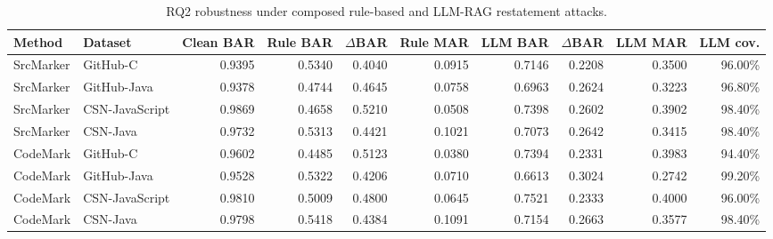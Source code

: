 \begin{table}[t]
\centering
\small
\begin{tabular}{llrrrrrrrr}
\toprule
Method & Dataset & Clean BAR & Rule BAR & $\Delta$BAR & Rule MAR & LLM BAR & $\Delta$BAR & LLM MAR & LLM cov. \\
\midrule
SrcMarker & GitHub-C & 0.9395 & 0.5340 & 0.4040 & 0.0915 & 0.7146 & 0.2208 & 0.3500 & 96.00\% \\
SrcMarker & GitHub-Java & 0.9378 & 0.4744 & 0.4645 & 0.0758 & 0.6963 & 0.2624 & 0.3223 & 96.80\% \\
SrcMarker & CSN-JavaScript & 0.9869 & 0.4658 & 0.5210 & 0.0508 & 0.7398 & 0.2602 & 0.3902 & 98.40\% \\
SrcMarker & CSN-Java & 0.9732 & 0.5313 & 0.4421 & 0.1021 & 0.7073 & 0.2642 & 0.3415 & 98.40\% \\
CodeMark & GitHub-C & 0.9602 & 0.4485 & 0.5123 & 0.0380 & 0.7394 & 0.2331 & 0.3983 & 94.40\% \\
CodeMark & GitHub-Java & 0.9528 & 0.5322 & 0.4206 & 0.0710 & 0.6613 & 0.3024 & 0.2742 & 99.20\% \\
CodeMark & CSN-JavaScript & 0.9810 & 0.5009 & 0.4800 & 0.0645 & 0.7521 & 0.2333 & 0.4000 & 96.00\% \\
CodeMark & CSN-Java & 0.9798 & 0.5418 & 0.4384 & 0.1091 & 0.7154 & 0.2663 & 0.3577 & 98.40\% \\
\bottomrule
\end{tabular}
\caption{RQ2 robustness under composed rule-based and LLM-RAG restatement attacks.}
\label{tab:rq2-main}
\end{table}
